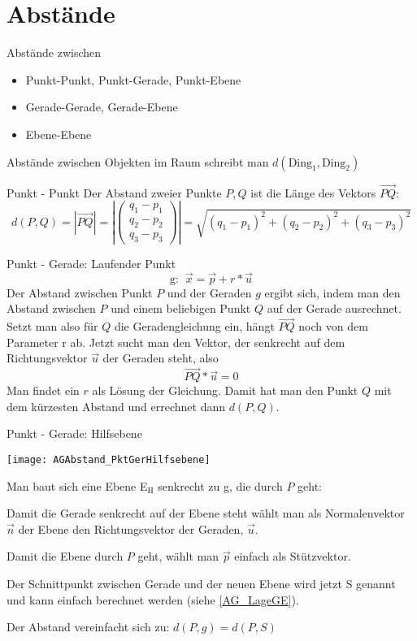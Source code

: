 \chapter{Abstände}
\begin{inhalt}
  Abstände zwischen
  \begin{itemize}
    \item Punkt-Punkt, Punkt-Gerade, Punkt-Ebene
    \item Gerade-Gerade, Gerade-Ebene
    \item Ebene-Ebene
  \end{itemize}
\end{inhalt}

Abstände zwischen Objekten im Raum schreibt man $d(\text{Ding}_1, \text{Ding}_2)$

\begin{bla}{Punkt - Punkt}
  Der Abstand zweier Punkte $P,Q$ ist die Länge des Vektors $\overrightarrow{PQ}$:
  \[
  d(P,Q)
  =
  \left| \overrightarrow{PQ} \right|
  =
  \left|\begin{pmatrix}
    q_1 - p_1 \\ q_2 - p_2 \\ q_3 - p_3
  \end{pmatrix}\right|
  =
  \sqrt{(q_1 - p_1)^2 + (q_2 - p_2)^2 + (q_3 - p_3)^2}
  \]
\end{bla}

\begin{bla}{Punkt - Gerade: Laufender Punkt}
  \[
  \text{g: }\ \vec{x} = \vec{p} + r * \vec{u}
  \]
  Der Abstand zwischen Punkt $P$ und der Geraden $g$ ergibt sich, indem man den Abstand zwischen $P$ und einem beliebigen Punkt $Q$ auf der Gerade ausrechnet.
  Setzt man also für $Q$ die Geradengleichung ein, hängt $\overrightarrow{PQ}$ noch von dem Parameter r ab.
  Jetzt sucht man den Vektor, der senkrecht auf dem Richtungsvektor $\vec{u}$ der Geraden steht, also
  \[
  \overrightarrow{PQ} * \vec{u} = 0
  \]
  Man findet ein $r$ als Lösung der Gleichung.
  Damit hat man den Punkt $Q$ mit dem kürzesten Abstand und errechnet dann $d(P,Q)$.
\end{bla}



\begin{bla}{Punkt - Gerade: Hilfsebene}
  \begin{marginfigure}[0em]
    \texttt{[image: AGAbstand\_PktGerHilfsebene]}
    \caption{Hilfsebene durch $P$, senkrecht zu Gerade g}
  \end{marginfigure}
  Man baut sich eine Ebene E$_\text{H}$ senkrecht zu g, die durch $P$ geht:

  Damit die Gerade senkrecht auf der Ebene steht wählt man als Normalenvektor $\vec{n}$ der Ebene den Richtungsvektor der Geraden, $\vec{u}$.

  Damit die Ebene durch $P$ geht, wählt man $\vec{p}$ einfach als Stützvektor.

  Der Schnittpunkt zwischen Gerade und der neuen Ebene wird jetzt S genannt und kann einfach berechnet werden (siehe \ref{AG_LageGE}).

  Der Abstand vereinfacht sich zu:
  $d(P,g) = d(P,S)$
\end{bla}

